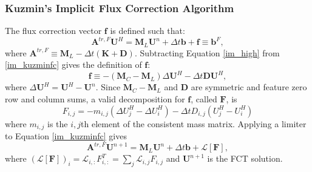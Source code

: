 \subsubsection{Kuzmin's Implicit Flux Correction Algorithm}\label{im_kuzmin}
The flux correction vector $\mathbf{f}$ is defined such that:
\begin{equation}\label{im_kuzminfc}
   \mathbf{A}^{tr,F}\mathbf{U}^H
      = \mathbf{M}_L\mathbf{U}^n + \Delta t\mathbf{b} + \mathbf{f} \equiv \mathbf{b}^F,
\end{equation}
where $\mathbf{A}^{tr,F} \equiv \mathbf{M}_L-\Delta t(\mathbf{K}+\mathbf{D})$.
Subtracting Equation \ref{im_high} from \ref{im_kuzminfc} gives the definition of
$\mathbf{f}$:
\begin{equation}\label{im_kuzminFdef}
   \mathbf{f} \equiv -(\mathbf{M}_C-\mathbf{M}_L)\Delta\mathbf{U}^H
      -\Delta t\mathbf{D}\mathbf{U}^H,
\end{equation}
where $\Delta\mathbf{U}^H = \mathbf{U}^H - \mathbf{U}^n$. Since
$\mathbf{M}_C-\mathbf{M}_L$ and $\mathbf{D}$ are symmetric
and feature zero row and column sums, a valid decomposition for $\mathbf{f}$,
called $\mathbf{F}$, is
\begin{equation}
   F_{i,j} = -m_{i,j}(\Delta U^H_j - \Delta U^H_i) - \Delta t D_{i,j}(U^H_j - U^H_i)
\end{equation}
where $m_{i,j}$ is the $i,j$th element of the consistent mass matrix.
Applying a limiter to Equation \ref{im_kuzminfc} gives
\begin{equation}\label{im_limited}
   \mathbf{A}^{tr,F}\mathbf{U}^{n+1}
      = \mathbf{M}_L\mathbf{U}^n + \Delta t\mathbf{b} + \mathcal{L}[\mathbf{F}],
\end{equation}
where $(\mathcal{L}[\mathbf{F}])_i = \mathcal{L}_{i,:}F_{i,:}^T
= \sum\limits_j \mathcal{L}_{i,j}F_{i,j}$ and $\mathbf{U}^{n+1}$ is the FCT solution.

